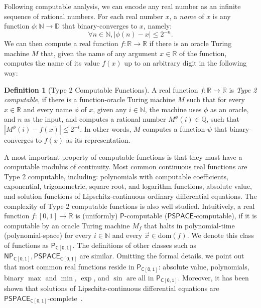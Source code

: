 \documentclass[10pt]{article}
\theoremstyle{definition}
\newtheorem{definition}{Definition}[section]
\newcommand{\N}{\mathbb{N}}
\newcommand{\dom}{\mathrm{dom}}
\newcommand{\R}{\mathbb{R}}
\begin{document}
Following computable analysis, we can encode any real number as an infinite sequence of rational numbers. For each real number $x$, a {\em name} of $x$ is any function $\phi: \N\rightarrow \mathbb{D}$ that {binary-converges} to $x$, namely: $$\forall n\in \N, |\phi(n) - x|\leq 2^{-n}.$$
We can then compute a real function $f:\mathbb{R}\rightarrow\mathbb{R}$ if there is an oracle Turing machine $M$ that, given the name of any argument $x\in\mathbb{R}$ of the function, computes the name of its value $f(x)$ up to an arbitrary digit in the following way:
\begin{definition}[Type 2 Computable Functions]
A real function $f: \R\rightarrow \R$
is {\em Type 2 computable}, if there is a function-oracle Turing machine $M$ such that for every $x\in \mathbb{R}$ and every name $\phi$ of $x$, given any $i\in\mathbb{N}$, the machine uses $\phi$ as an oracle, and $n$ as the input, and computes a rational number $M^{\phi}(i)\in\mathbb{Q}$, such that $|M^{\phi}(i)-f(x)|\leq 2^{-i}$. In other words, $M$ computes a function $\psi$ that binary-converges to $f(x)$ as its representation. 
\end{definition}
A most important property of computable functions is that they must have a computable modulus of continuity. Most common continuous real functions are Type 2 computable, including: polynomials with computable coefficients, exponential, trigonometric, square root, and logarithm functions, absolute value, and solution functions of Lipschitz-continuous ordinary differential equations. The complexity of Type 2 computable functions is also well studied. Intuitively, a real function $f:[0,1]\rightarrow\mathbb{R}$ is (uniformly) $\mathsf{P}$-computable ($\mathsf{PSPACE}$-computable), if it is computable by an oracle Turing machine $M_{f}$ that halts in polynomial-time (polynomial-space) for every $i\in \mathbb{N}$ and every $\vec x\in \dom(f)$. We denote this class of functions as $\mathsf{P_{C[0,1]}}$. The definitions of other classes such as $\mathsf{NP_{C[0,1]}}, \mathsf{PSPACE_{C[0,1]}}$ are similar. Omitting the formal details, we point out that most common real functions reside in $\mathsf{P_{C[0,1]}}$: absolute value, polynomials, binary $\max$ and $\min$, $\exp$, and $\sin$ are all in $\mathsf{P_{C[0,1]}}$. Moreover, it has been shown that solutions of Lipschitz-continuous differential equations are $\mathsf{PSPACE_{C[0,1]}}$-complete~\cite{DBLP:journals/cc/Kawamura10,Kobook}.
\end{document}
